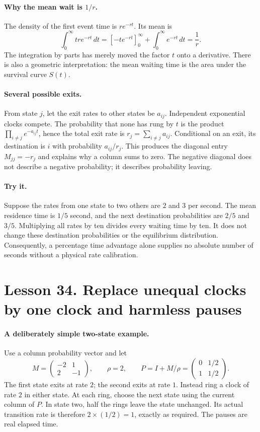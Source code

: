 \documentclass[11pt]{article}
\begin{document}
\paragraph{Why the mean wait is $1/r$.}
The density of the first event time is $re^{-rt}$. Its mean is
\[
 \int_0^\infty t r e^{-rt}\,dt
 =[-te^{-rt}]_0^\infty+\int_0^\infty e^{-rt}\,dt=\frac1r.
\]
The integration by parts has merely moved the factor $t$ onto a derivative.
There is also a geometric interpretation: the mean waiting time is the area
under the survival curve $S(t)$.

\paragraph{Several possible exits.}
From state $j$, let the exit rates to other states be $a_{ij}$.
Independent exponential clocks compete. The probability that none has rung
by $t$ is the product $\prod_{i\ne j}e^{-a_{ij}t}$, hence the total exit rate
is $r_j=\sum_{i\ne j}a_{ij}$. Conditional on an exit, its destination is $i$
with probability $a_{ij}/r_j$. This produces the diagonal entry
$M_{jj}=-r_j$ and explains why a column sums to zero. The negative diagonal
does not describe a negative probability; it describes probability leaving.

\paragraph{Try it.}
Suppose the rates from one state to two others are $2$ and $3$ per second.
The mean residence time is $1/5$ second, and the next destination probabilities
are $2/5$ and $3/5$. Multiplying all rates by ten divides every waiting time
by ten. It does not change these destination probabilities or the equilibrium
distribution. Consequently, a percentage time advantage alone supplies no
absolute number of seconds without a physical rate calibration.

\section*{Lesson 34. Replace unequal clocks by one clock and harmless pauses}
\paragraph{A deliberately simple two-state example.}
Use a column probability vector and let
\[
 M=\begin{pmatrix}-2&1\\2&-1\end{pmatrix},\qquad
 \rho=2,\qquad
 P=I+M/\rho=\begin{pmatrix}0&1/2\\1&1/2\end{pmatrix}.
\]
The first state exits at rate $2$; the second exits at rate $1$.
Instead ring a clock of rate $2$ in either state. At each ring, choose the
next state using the current column of $P$. In state two, half the rings
leave the state unchanged. Its actual transition rate is therefore
$2\times(1/2)=1$, exactly as required. The pauses are real elapsed time.
\end{document}
